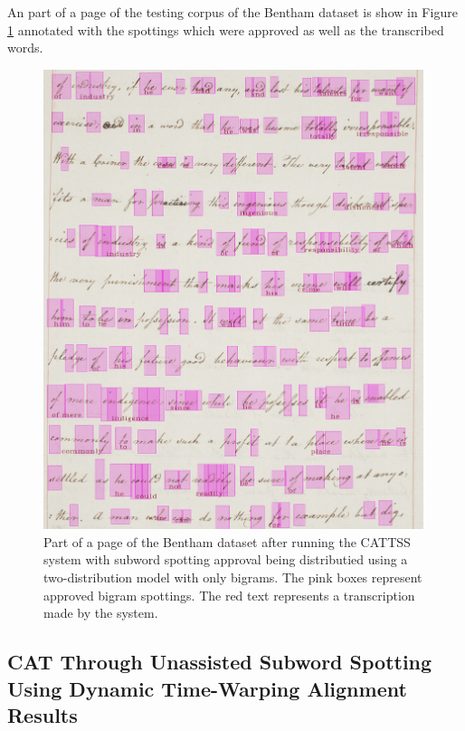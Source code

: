 \documentclass[ms,electronic,twosidetoc,letterpaper,chaptercenter,parttop,lol,lof,lot]{byumsphd}
\begin{document}
An part of a page of the testing corpus of the Bentham dataset is show in Figure \ref{fig:aftercattss} annotated with the spottings which were approved as well as the transcribed words.


\begin{figure}
    \centering
    \includegraphics[width=0.99\textwidth]{aftercattss}
    \caption{Part of a page of the Bentham dataset after running the CATTSS system with subword spotting approval being distributied using a two-distribution model with only bigrams. The pink boxes represent approved bigram spottings. The red text represents a transcription made by the system.}
    \label{fig:aftercattss}
\end{figure}




\subsection{CAT Through Unassisted Subword Spotting Using Dynamic Time-Warping Alignment Results}
\end{document}
